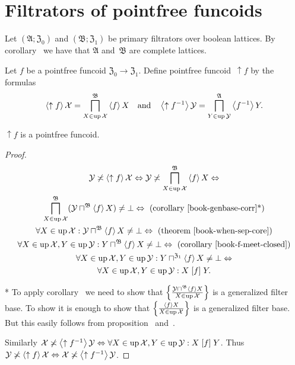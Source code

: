 \chapter{Filtrators of pointfree funcoids}

Let $(\mathfrak{A};\mathfrak{Z}_0)$ and $(\mathfrak{B};\mathfrak{Z}_1)$ be primary filtrators over boolean lattices.
By corollary~ we have that $\mathfrak{A}$ and~$\mathfrak{B}$ are complete lattices.

Let $f$ be a pointfree funcoid $\mathfrak{Z}_0\rightarrow\mathfrak{Z}_1$. Define pointfree funcoid~$\uparrow f$
by the formulas
\[
\left\langle \uparrow f\right\rangle \mathcal{X} = \bigsqcap^{\mathfrak{B}}_{X\in\operatorname{up}\mathcal{X}} \left\langle f\right\rangle X \quad\text{and}\quad
\left\langle \uparrow f^{-1}\right\rangle \mathcal{Y} = \bigsqcap^{\mathfrak{A}}_{Y\in\operatorname{up}\mathcal{Y}} \left\langle f^{-1}\right\rangle Y.
\]

\begin{prop}
$\uparrow f$ is a pointfree funcoid.
\end{prop}

\begin{proof}
~
\begin{multline*}
\mathcal{Y} \nasymp \supfun{\uparrow f} \mathcal{X} \Leftrightarrow
\mathcal{Y} \nasymp \bigsqcap^{\mathfrak{B}}_{X\in\up\mathcal{X}} \supfun{f}X \Leftrightarrow \\
\bigsqcap^{\mathfrak{B}}_{X\in\up\mathcal{X}} (\mathcal{Y} \sqcap^{\mathfrak{B}} \supfun{f}X) \ne \bot \Leftrightarrow \text{ (corollary~\bookref{genbase-corr}*)} \\
\forall X\in\up\mathcal{X}: \mathcal{Y} \sqcap^{\mathfrak{B}} \supfun{f}X \ne \bot \Leftrightarrow \text{ (theorem \bookref{when-sep-core})} \\
\forall X\in\up\mathcal{X}, Y\in\up\mathcal{Y}: Y \sqcap^{\mathfrak{B}} \supfun{f}X \ne \bot \Leftrightarrow \text{ (corollary \bookref{f-meet-closed})} \\
\forall X\in\up\mathcal{X}, Y\in\up\mathcal{Y}: Y \sqcap^{\mathfrak{Z}_1} \supfun{f}X \ne \bot \Leftrightarrow \\
\forall X\in\up\mathcal{X}, Y\in\up\mathcal{Y}: X\suprel{f}Y.
\end{multline*}

* To apply corollary~ we need to show that
$\left\{ \frac{\mathcal{Y} \sqcap^{\mathfrak{B}} \left\langle f\right\rangle X}{X\in\operatorname{up}\mathcal{X}}\right\}$ is a generalized filter base.
To show it is enough to show that $\left\{ \frac{\left\langle f\right\rangle X}{X\in\operatorname{up}\mathcal{X}}\right\}$ is a generalized filter base.
But this easily follows from proposition~ and~.

Similarly $\mathcal{X} \not\asymp \left\langle \uparrow f^{-1}\right\rangle \mathcal{Y} \Leftrightarrow
\forall X\in\operatorname{up}\mathcal{X}, Y\in\operatorname{up}\mathcal{Y}: X\mathrel{\left[f\right]}Y$.
Thus $\mathcal{Y} \not\asymp \left\langle \uparrow f\right\rangle \mathcal{X} \Leftrightarrow \mathcal{X} \not\asymp \left\langle \uparrow f^{-1}\right\rangle \mathcal{Y}$.
\end{proof}

